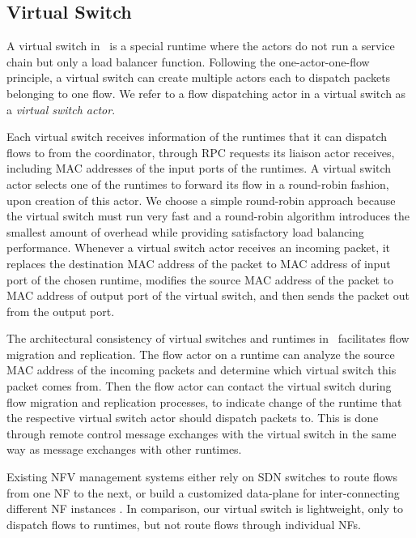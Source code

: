 \subsection{Virtual Switch}
\label{sec:virtualswitch}

A virtual switch in \nfactor~is a special runtime where the actors do not run a service chain but only a load balancer function. Following the one-actor-one-flow principle, a virtual switch can create multiple actors each to dispatch packets belonging to one flow. We refer to a flow dispatching actor in a virtual switch as a {\em virtual switch actor}. 


Each virtual switch receives information of the runtimes that it can dispatch flows to from the coordinator, through RPC requests its liaison actor receives, including MAC addresses of the input ports of the runtimes. A virtual switch actor selects one of the runtimes to forward its flow in a round-robin fashion, upon creation of this actor. We choose a simple round-robin approach because the virtual switch must run very fast and a round-robin algorithm introduces the smallest amount of overhead while providing satisfactory load balancing performance. Whenever a virtual switch actor receives an incoming packet, it replaces the destination MAC address of the packet to MAC address of input port of the chosen runtime, modifies the source MAC address of the packet to MAC address of output port of the virtual switch, and then sends the packet out from the output port.

The architectural consistency of virtual switches and runtimes in \nfactor~facilitates flow migration and replication. The flow actor on a runtime can analyze the source MAC address of the incoming packets and determine which virtual switch this packet comes from. Then the flow actor can contact the virtual switch during flow migration and replication processes, to indicate change of the runtime that the respective virtual switch actor should dispatch packets to. This is done through remote control message exchanges with the virtual switch in the same way as message exchanges with other runtimes.


Existing NFV management systems either rely on SDN switches \cite{gember2012stratos, gember2015opennf} to route flows from one NF to the next, or build a customized data-plane for inter-connecting different NF instances \cite{palkar2015e2}. In comparison, our virtual switch is lightweight, only to dispatch flows to runtimes, but not route flows through individual NFs.


